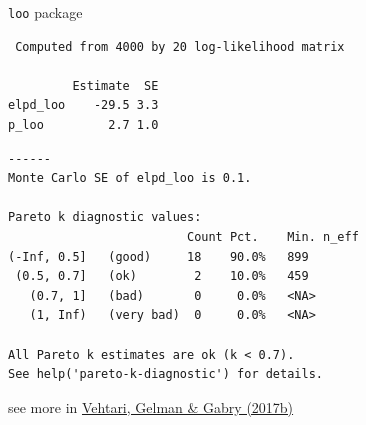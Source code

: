 \documentclass[english,t]{beamer}
\begin{document}
\begin{frame}[fragile]

  {\Large\color{navyblue} {\tt loo} package}

  {\scriptsize
    {\color{gray}
\begin{lstlisting}
 Computed from 4000 by 20 log-likelihood matrix

         Estimate  SE
elpd_loo    -29.5 3.3
p_loo         2.7 1.0
\end{lstlisting}
      }
\begin{lstlisting}
------
Monte Carlo SE of elpd_loo is 0.1.

Pareto k diagnostic values:
                         Count Pct.    Min. n_eff
(-Inf, 0.5]   (good)     18    90.0%   899       
 (0.5, 0.7]   (ok)        2    10.0%   459       
   (0.7, 1]   (bad)       0     0.0%   <NA>      
   (1, Inf)   (very bad)  0     0.0%   <NA>      

All Pareto k estimates are ok (k < 0.7).
See help('pareto-k-diagnostic') for details.
\end{lstlisting}
    }

    {\vspace{2\baselineskip}\small see more in \href{http://link.springer.com/article/10.1007/s11222-016-9696-4}{Vehtari, Gelman \& Gabry (2017b)}}

\end{frame}


\end{document}
